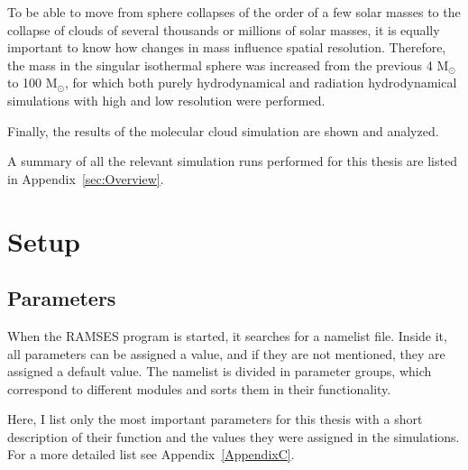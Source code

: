 To be able to move from sphere collapses of the order of a few solar masses to the collapse of clouds of several thousands or millions of solar masses, it is equally important to know how changes in mass influence spatial resolution.
Therefore, the mass in the singular isothermal sphere was increased from the previous 4 M$_{\odot}$ to 100 M$_{\odot}$, for which both purely hydrodynamical and radiation hydrodynamical simulations with high and low resolution were performed.

Finally, the results of the molecular cloud simulation are shown and analyzed.

A summary of all the relevant simulation runs performed for this thesis are listed in Appendix~\ref{sec:Overview}.

\section{Setup}
\label{sec:Setup}

\subsection{Parameters}
\label{subsec:Parameters}


When the RAMSES program is started, it searches for a namelist file.
Inside it, all parameters can be assigned a value, and if they are not mentioned, they are assigned a default value.
The namelist is divided in parameter groups, which correspond to different modules and sorts them in their functionality.

Here, I list only the most important parameters for this thesis with a short description of their function and the values they were assigned in the simulations.
For a more detailed list see Appendix~\ref{AppendixC}. \\[-3pt]

